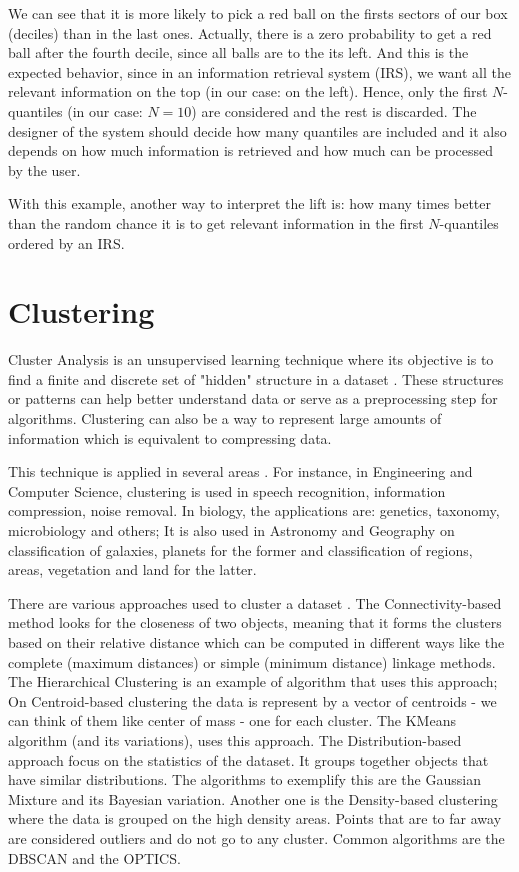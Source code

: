 We can see that it is more likely to pick a red ball on the firsts sectors of our box (deciles) than in the last ones. Actually, there is a zero probability to get a red ball after the fourth decile, since all balls are to the its left. And this is the expected behavior, since in an information retrieval system (IRS), we want all the relevant information on the top (in our case: on the left). Hence, only the first $N$-quantiles (in our case: $N = 10$) are considered and the rest is discarded. The designer of the system should decide how many quantiles are included and it also depends on how much information is retrieved and how much can be processed by the user.

With this example, another way to interpret the lift is: how many times better than the random chance it is to get relevant information in the first $N$-quantiles ordered by an IRS.

\section{Clustering}

Cluster Analysis is an unsupervised learning technique where its objective is to find a finite and discrete set of "hidden" structure in a dataset \cite{xu2008clustering}. These structures or patterns can help better understand data or serve as a preprocessing step for algorithms. Clustering can also be a way to represent large amounts of information which is equivalent to compressing data. 

This technique is applied in several areas \cite{sabine2001cluster}. For instance, in Engineering and Computer Science, clustering is used in speech recognition, information compression, noise removal. In biology, the applications are: genetics, taxonomy, microbiology and others; It is also used in Astronomy and Geography on classification of galaxies, planets for the former and classification of regions, areas, vegetation and land for the latter.

There are various approaches used to cluster a dataset \cite{wikipedia_cluster_analysis}. The Connectivity-based method looks for the closeness of two objects, meaning that it forms the clusters based on their relative distance which can be computed in different ways like the complete (maximum distances) or simple (minimum distance) linkage methods. The Hierarchical Clustering is an example of algorithm that uses this approach; On Centroid-based clustering the data is represent by a vector of centroids - we can think of them like center of mass - one for each cluster. The KMeans algorithm (and its variations), uses this approach. The Distribution-based approach focus on the statistics of the dataset. It groups together objects that have similar distributions. The algorithms to exemplify this are the Gaussian Mixture and its Bayesian variation. Another one is the Density-based clustering where the data is grouped on the high density areas. Points that are to far away are considered outliers and do not go to any cluster. Common algorithms are the DBSCAN and the OPTICS.


